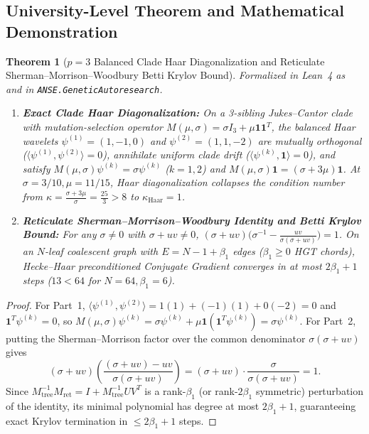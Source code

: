 \documentclass[11pt,a4paper]{article}
\newtheorem{theorem}{Theorem}[section]
\theoremstyle{definition}
\theoremstyle{remark}
\begin{document}
\subsection{University-Level Theorem and Mathematical Demonstration}

\begin{theorem}[$p=3$ Balanced Clade Haar Diagonalization and Reticulate Sherman--Morrison--Woodbury Betti Krylov Bound]
\label{thm:sec7_hecke_woodbury}
Formalized in Lean~4 as  and  in \texttt{ANSE.GeneticAutoresearch}.
\begin{enumerate}
  \item \textbf{Exact Clade Haar Diagonalization:} On a 3-sibling Jukes--Cantor clade with mutation-selection operator $M(\mu,\sigma) = \sigma I_3 + \mu \mathbf{1}\mathbf{1}^T$, the balanced Haar wavelets $\psi^{(1)} = (1, -1, 0)$ and $\psi^{(2)} = (1, 1, -2)$ are mutually orthogonal ($\langle\psi^{(1)}, \psi^{(2)}\rangle = 0$), annihilate uniform clade drift ($\langle\psi^{(k)}, \mathbf{1}\rangle = 0$), and satisfy $M(\mu,\sigma)\psi^{(k)} = \sigma\psi^{(k)}$ ($k=1,2$) and $M(\mu,\sigma)\mathbf{1} = (\sigma + 3\mu)\mathbf{1}$. At $\sigma = 3/10, \mu = 11/15$, Haar diagonalization collapses the condition number from $\kappa = \frac{\sigma+3\mu}{\sigma} = \frac{25}{3} > 8$ to $\kappa_{\mathrm{Haar}} = 1$.
  \item \textbf{Reticulate Sherman--Morrison--Woodbury Identity and Betti Krylov Bound:} For any $\sigma \neq 0$ with $\sigma + uv \neq 0$, $(\sigma + uv)\bigl(\sigma^{-1} - \frac{uv}{\sigma(\sigma+uv)}\bigr) = 1$. On an $N$-leaf coalescent graph with $E = N - 1 + \beta_1$ edges ($\beta_1 \ge 0$ HGT chords), Hecke--Haar preconditioned Conjugate Gradient converges in at most $2\beta_1 + 1$ steps ($13 < 64$ for $N = 64, \beta_1 = 6$).
\end{enumerate}
\end{theorem}

\begin{proof}
For Part~1, $\langle\psi^{(1)}, \psi^{(2)}\rangle = 1(1) + (-1)(1) + 0(-2) = 0$ and $\mathbf{1}^T\psi^{(k)} = 0$, so $M(\mu,\sigma)\psi^{(k)} = \sigma\psi^{(k)} + \mu\mathbf{1}(\mathbf{1}^T\psi^{(k)}) = \sigma\psi^{(k)}$. For Part~2, putting the Sherman--Morrison factor over the common denominator $\sigma(\sigma+uv)$ gives
\[
  (\sigma + uv)\left(\frac{(\sigma + uv) - uv}{\sigma(\sigma + uv)}\right) = (\sigma + uv)\cdot\frac{\sigma}{\sigma(\sigma + uv)} = 1.
\]
Since $M_{\mathrm{tree}}^{-1} M_{\mathrm{ret}} = I + M_{\mathrm{tree}}^{-1} U V^T$ is a rank-$\beta_1$ (or rank-$2\beta_1$ symmetric) perturbation of the identity, its minimal polynomial has degree at most $2\beta_1 + 1$, guaranteeing exact Krylov termination in $\le 2\beta_1 + 1$ steps.
\end{proof}
\end{document}
